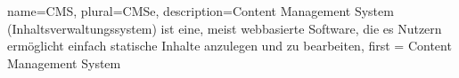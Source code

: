  {
  name={CMS},
  plural={CMSe},
  description={Content Management System (Inhaltsverwaltungssystem) ist eine, meist webbasierte Software, die es Nutzern ermöglicht einfach statische Inhalte anzulegen und zu bearbeiten},
first = {Content Management System}
}
\newcommand{\glossar}[1]{$^\uparrow$\gls{#1}}

\newcommand{\glossarpl}[1]{$^\uparrow$\glspl{#1}}
\glsaddall

\renewcommand{\glossarypreamble}{Im Folgenden werden einige oft verwendete Begriffe näher erläutert. Innerhalb des Hauptteils dieser Arbeit sind diese Begriffe mit einem $^\uparrow$ gekennzeichnet.}

\printglossary[toctitle=Glossar]

